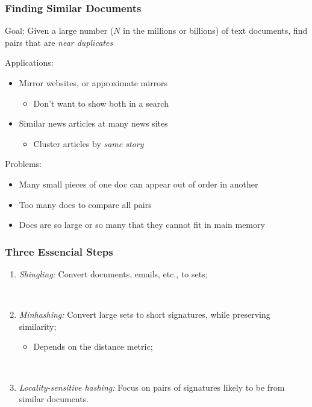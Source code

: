 \documentclass[svgnames]{beamer}
\begin{document}
\begin{frame} \frametitle{Finding Similar Documents}

\begin{block}{Goal:}
Given a large number ($N$ in the millions or billions) of text documents, find pairs that are \emph{near duplicates}
\end{block}

\begin{block}{Applications:}
  \scriptsize
  \begin{itemize}
  \item Mirror websites, or approximate mirrors
    \begin{itemize}\scriptsize
    \item Don’t want to show both in a search
    \end{itemize}
  \item Similar news articles at many news sites
    \begin{itemize}\scriptsize
    \item Cluster articles by \emph{same story}
    \end{itemize}
  \end{itemize}
\end{block}
\begin{block}{Problems:}
  \scriptsize
  \begin{itemize}
  \item Many small pieces of one doc can appear out of order in another
  \item Too many docs to compare all pairs
  \item Docs are so large or so many that they cannot fit in main memory
  \end{itemize}
\end{block}
\end{frame}

  
\begin{frame} \frametitle{Three Essencial Steps}

\begin{enumerate}
\item \emph{Shingling:} Convert documents, emails, etc., to sets;

~\\

\item \emph{Minhashing:} Convert large sets to short signatures, while preserving similarity;
   \begin{itemize}
   \item Depends on the distance metric;
   \end{itemize}

~\\

\item \emph{Locality-sensitive hashing:} Focus on pairs of signatures likely to be from similar documents.
\end{enumerate}

\end{frame}
\end{document}

